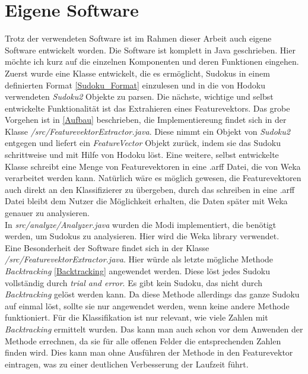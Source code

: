 \newpage
\section{Eigene Software}
\label{Eigene_Software}
Trotz der verwendeten Software ist im Rahmen dieser Arbeit auch eigene Software entwickelt worden. Die Software ist komplett in Java geschrieben. Hier möchte ich kurz auf die einzelnen Komponenten und deren Funktionen eingehen.\\
Zuerst wurde eine Klasse entwickelt, die es ermöglicht, Sudokus in einem definierten Format \ref{Sudoku_Format} einzulesen und in die von Hodoku verwendeten \textit{Sudoku2} Objekte zu parsen. Die nächste, wichtige und selbst entwickelte Funktionalität ist das Extrahieren eines Featurevektors. Das grobe Vorgehen ist in \ref{Aufbau} beschrieben, die Implementiereung findet sich in der Klasse \textit{/src/FeaturevektorExtractor.java}. Diese nimmt ein Objekt von \textit{Sudoku2} entgegen und liefert ein \textit{FeatureVector} Objekt zurück, indem sie das Sudoku schrittweise und mit Hilfe von Hodoku löst. Eine weitere, selbst entwickelte Klasse schreibt eine Menge von Featurevektoren in eine .arff Datei, die von Weka verarbeitet werden kann. Natürlich wäre es möglich gewesen, die Featurevektoren auch direkt an den Klassifizierer zu übergeben, durch das schreiben in eine .arff Datei bleibt dem Nutzer die Möglichkeit erhalten, die Daten später mit Weka genauer zu analysieren.\\
In \textit{src/analyze/Analyzer.java} wurden die Modi implementiert, die benötigt werden, um Sudokus zu analysieren. Hier wird die Weka library verwendet.\\
Eine Besonderheit der Software findet sich in der Klasse \textit{/src/FeaturevektorExtractor.java}. Hier würde als letzte mögliche Methode \textit{Backtracking} \ref{Backtracking} angewendet werden. Diese löst jedes Sudoku vollständig durch \textit{trial and error}. Es gibt kein Sudoku, das nicht durch \textit{Backtracking} gelöst werden kann. Da diese Methode allerdings das ganze Sudoku auf einmal löst, sollte sie nur angewendet werden, wenn keine andere Methode funktioniert. Für die Klassifikation ist nur relevant, wie viele Zahlen mit \textit{Backtracking} ermittelt wurden. Das kann man auch schon vor dem Anwenden der Methode errechnen, da sie für alle offenen Felder die entsprechenden Zahlen finden wird. Dies kann man ohne Ausführen der Methode in den Featurevektor eintragen, was zu einer deutlichen Verbesserung der Laufzeit führt.